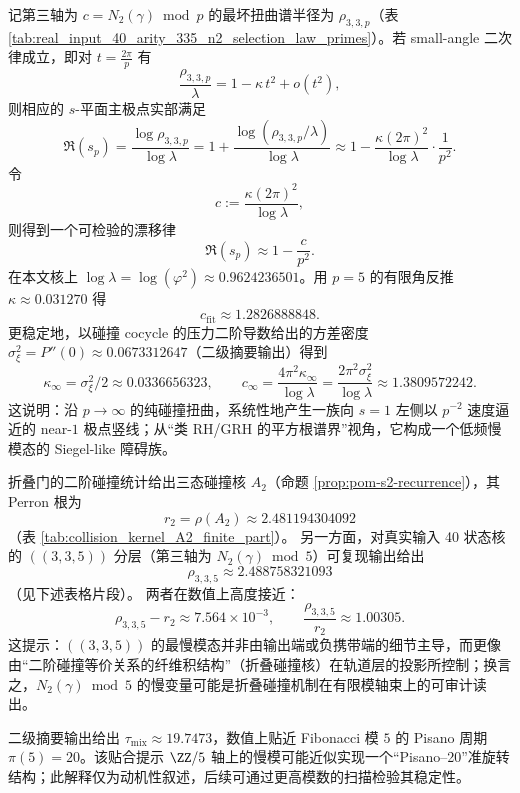 \begin{remark}\label{rem:arity-335-near1-pole-drift}
记第三轴为 \(c=N_2(\gamma)\bmod p\) 的最坏扭曲谱半径为 \(\rho_{3,3,p}\)（表 \ref{tab:real_input_40_arity_335_n2_selection_law_primes}）。若 small-angle 二次律成立，即对 \(t=\frac{2\pi}{p}\) 有
\[
\frac{\rho_{3,3,p}}{\lambda}=1-\kappa\,t^2+o(t^2),
\]
则相应的 \(s\)-平面主极点实部满足
\[
\Re(s_p)
=\frac{\log\rho_{3,3,p}}{\log\lambda}
=1+\frac{\log(\rho_{3,3,p}/\lambda)}{\log\lambda}
\approx 1-\frac{\kappa(2\pi)^2}{\log\lambda}\cdot\frac{1}{p^2}.
\]
令
\[
c:=\frac{\kappa(2\pi)^2}{\log\lambda},
\]
则得到一个可检验的漂移律
$$
\Re(s_p)\approx 1-\frac{c}{p^2}.
$$
在本文核上 \(\log\lambda=\log(\varphi^2)\approx 0.9624236501\)。用 \(p=5\) 的有限角反推 \(\kappa\approx 0.031270\) 得
\[
c_{\mathrm{fit}}\approx 1.2826888848.
\]
更稳定地，以碰撞 cocycle 的压力二阶导数给出的方差密度 \(\sigma_\xi^2=P''(0)\approx 0.0673312647\)（二级摘要输出）得到
\[
\kappa_\infty=\sigma_\xi^2/2\approx 0.0336656323,
\qquad
c_\infty=\frac{4\pi^2\kappa_\infty}{\log\lambda}=\frac{2\pi^2\sigma_\xi^2}{\log\lambda}\approx 1.3809572242.
\]
这说明：沿 \(p\to\infty\) 的纯碰撞扭曲，系统性地产生一族向 \(s=1\) 左侧以 \(p^{-2}\) 速度逼近的 near-\(1\) 极点竖线；从“类 RH/GRH 的平方根谱界”视角，它构成一个低频慢模态的 Siegel-like 障碍族。
\end{remark}

\begin{remark}[慢模与折叠碰撞核的同源性信号]\label{rem:arity-335-rho-close-to-a2}\label{rem:arity-335-r2-vs-rho}
折叠门的二阶碰撞统计给出三态碰撞核 \(A_2\)（命题 \ref{prop:pom-s2-recurrence}），其 Perron 根为
$$
r_2=\rho(A_2)\approx 2.481194304092
$$
（表 \ref{tab:collision_kernel_A2_finite_part}）。
另一方面，对真实输入 40 状态核的 \(((3,3,5))\) 分层（第三轴为 \(N_2(\gamma)\bmod 5\)）可复现输出给出
$$
\rho_{3,3,5}\approx 2.488758321093
$$
（见下述表格片段）。
两者在数值上高度接近：
$$
\rho_{3,3,5}-r_2\approx 7.564\times 10^{-3},
\qquad
\frac{\rho_{3,3,5}}{r_2}\approx 1.00305.
$$
这提示：\(((3,3,5))\) 的最慢模态并非由输出端或负携带端的细节主导，而更像由“二阶碰撞等价关系的纤维积结构”（折叠碰撞核）在轨道层的投影所控制；换言之，\(N_2(\gamma)\bmod 5\) 的慢变量可能是折叠碰撞机制在有限模轴束上的可审计读出。
\end{remark}

\begin{remark}\label{rem:arity-335-pisano}
二级摘要输出给出
\(
\tau_{\mathrm{mix}}\approx 19.7473
\)，数值上贴近 Fibonacci 模 $5$ 的 Pisano 周期 $\pi(5)=20$。该贴合提示 $\ZZ/5$ 轴上的慢模可能近似实现一个“Pisano--20”准旋转结构；此解释仅为动机性叙述，后续可通过更高模数的扫描检验其稳定性。
\end{remark}

